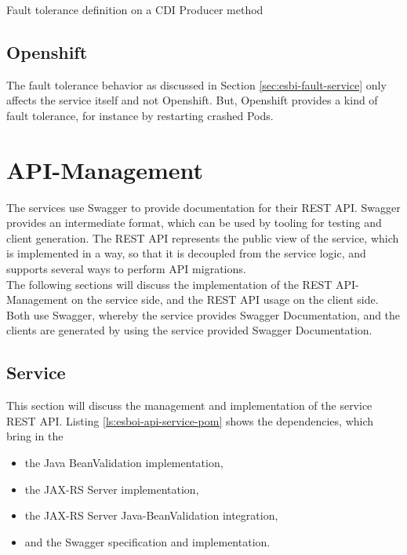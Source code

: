 \begin{listing}[h]
	\caption{Fault tolerance definition on a CDI Producer method}
	\label{ls:esboi-fault-tolerance-java}
\end{listing} 

\subsection{Openshift}
\label{sec:esbi-fault-openshift}
The fault tolerance behavior as discussed in Section \vref{sec:esbi-fault-service} only affects the service itself and not Openshift. But, Openshift provides a kind of fault tolerance, for instance by restarting crashed Pods.

\section{API-Management}
\label{sec:esbi-api}
The services use Swagger to provide documentation for their REST API. Swagger provides an intermediate format, which can be used by tooling for testing and client generation. The REST API represents the public view of the service, which is implemented in a way, so that it is decoupled from the service logic, and supports several ways to perform API migrations. \\

The following sections will discuss the implementation of the REST API-Management on the service side, and the REST API usage on the client side. Both use Swagger, whereby the service provides Swagger Documentation, and the clients are generated by using the service provided Swagger Documentation.

\subsection{Service}
\label{sec:esbi-api-service}
This section will discuss the management and implementation of the service REST API. Listing \vref{ls:esboi-api-service-pom} shows the dependencies, which bring in the 
\begin{itemize}
	\item the Java BeanValidation implementation, 
	\item the JAX-RS Server implementation,
	\item the JAX-RS Server Java-BeanValidation integration,
	\item and the Swagger specification and implementation. 
\end{itemize}


